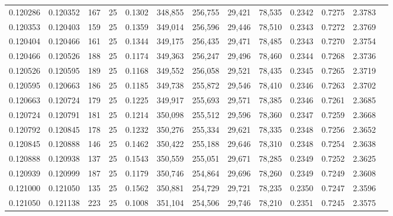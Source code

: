 \begin{tabular}{rrrrrrrrrrrrr}
0.120286 & 0.120352 &   167 &  25 &                                     0.1302 & 348,855 & 256,755 &  29,421 &  78,535 & 0.2342 & 0.7275 & 2.3783 \\
0.120353 & 0.120403 &   159 &  25 &                                     0.1359 & 349,014 & 256,596 &  29,446 &  78,510 & 0.2343 & 0.7272 & 2.3769 \\
0.120404 & 0.120466 &   161 &  25 &                                     0.1344 & 349,175 & 256,435 &  29,471 &  78,485 & 0.2343 & 0.7270 & 2.3754 \\
0.120466 & 0.120526 &   188 &  25 &                                     0.1174 & 349,363 & 256,247 &  29,496 &  78,460 & 0.2344 & 0.7268 & 2.3736 \\
0.120526 & 0.120595 &   189 &  25 &                                     0.1168 & 349,552 & 256,058 &  29,521 &  78,435 & 0.2345 & 0.7265 & 2.3719 \\
0.120595 & 0.120663 &   186 &  25 &                                     0.1185 & 349,738 & 255,872 &  29,546 &  78,410 & 0.2346 & 0.7263 & 2.3702 \\
0.120663 & 0.120724 &   179 &  25 &                                     0.1225 & 349,917 & 255,693 &  29,571 &  78,385 & 0.2346 & 0.7261 & 2.3685 \\
0.120724 & 0.120791 &   181 &  25 &                                     0.1214 & 350,098 & 255,512 &  29,596 &  78,360 & 0.2347 & 0.7259 & 2.3668 \\
0.120792 & 0.120845 &   178 &  25 &                                     0.1232 & 350,276 & 255,334 &  29,621 &  78,335 & 0.2348 & 0.7256 & 2.3652 \\
0.120845 & 0.120888 &   146 &  25 &                                     0.1462 & 350,422 & 255,188 &  29,646 &  78,310 & 0.2348 & 0.7254 & 2.3638 \\
0.120888 & 0.120938 &   137 &  25 &                                     0.1543 & 350,559 & 255,051 &  29,671 &  78,285 & 0.2349 & 0.7252 & 2.3625 \\
0.120939 & 0.120999 &   187 &  25 &                                     0.1179 & 350,746 & 254,864 &  29,696 &  78,260 & 0.2349 & 0.7249 & 2.3608 \\
0.121000 & 0.121050 &   135 &  25 &                                     0.1562 & 350,881 & 254,729 &  29,721 &  78,235 & 0.2350 & 0.7247 & 2.3596 \\
0.121050 & 0.121138 &   223 &  25 &                                     0.1008 & 351,104 & 254,506 &  29,746 &  78,210 & 0.2351 & 0.7245 & 2.3575 \\

\end{tabular}

